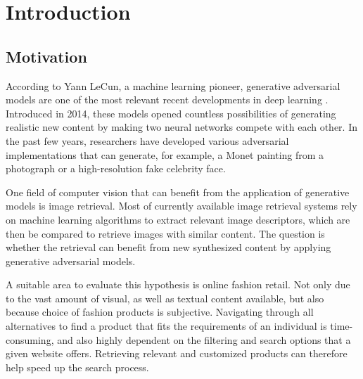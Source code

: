 \documentclass[12pt]{report}
\renewcommand{\headrulewidth}{0pt}%
\begin{document}


\pagestyle{plain}
\renewcommand{\baselinestretch}{0.75}\normalsize
\tableofcontents
\renewcommand{\baselinestretch}{1.0}\normalsize
\clearpage


\pagestyle{fancy}
\fancyhf{}
\renewcommand{\chaptermark}[1]{\markboth{\thechapter.\space#1}{}} 
\lhead{\slshape\nouppercase{\leftmark}}
\rhead{ \thepage}
\renewcommand{\headrulewidth}{.5pt}
\chapter{Introduction}

\section{Motivation}
According to Yann LeCun, a machine learning pioneer, generative adversarial models are one of the most relevant recent developments in deep learning \cite{yann_lecun_what_2016}. Introduced in 2014, these models opened countless possibilities of generating realistic new content by making two neural networks compete with each other. In the past few years, researchers have developed various adversarial implementations that can generate, for example, a Monet painting from a photograph or  a high-resolution fake celebrity face.

One field of computer vision that can benefit from the application of generative models is image retrieval. Most of currently available image retrieval systems rely on machine learning algorithms to extract relevant image descriptors, which are then be compared to retrieve images with similar content. The question is whether the retrieval can benefit from new synthesized content by applying generative adversarial models.

A suitable area to evaluate this hypothesis is online fashion retail. Not only due to the vast amount of visual, as well as textual content available, but also because choice of fashion products is subjective. Navigating through all alternatives to find a product that fits the requirements of an individual is time-consuming, and also highly dependent on the filtering and search options that a given website offers. Retrieving relevant and customized products can therefore help speed up the search process.
\end{document}
